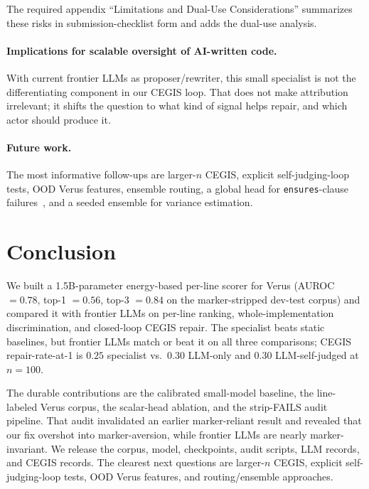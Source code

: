 \documentclass[10pt]{article}
\begin{document}
The required appendix ``Limitations and Dual-Use Considerations''
summarizes these risks in submission-checklist form and adds the
dual-use analysis.

\paragraph{Implications for scalable oversight of AI-written code.}
With current frontier LLMs as proposer/rewriter, this small specialist
is not the differentiating component in our CEGIS loop. That does not
make attribution irrelevant; it shifts the question to what kind of
signal helps repair, and which actor should produce it.

\paragraph{Future work.}
The most informative follow-ups are larger-$n$ CEGIS, explicit
self-judging-loop tests, OOD Verus features, ensemble routing, a global
head for \texttt{ensures}-clause failures~\cite{ilse2018attentionmil},
and a seeded ensemble for variance estimation.

\section{Conclusion}
\label{sec:conclusion}
We built a 1.5B-parameter energy-based per-line scorer for Verus
(AUROC $=0.78$, top-1 $=0.56$, top-3 $=0.84$ on the marker-stripped
dev-test corpus) and compared it with frontier LLMs on per-line
ranking, whole-implementation discrimination, and closed-loop CEGIS
repair. The specialist beats static baselines, but frontier LLMs match
or beat it on all three comparisons; CEGIS repair-rate-at-1 is
$0.25$ specialist vs.\ $0.30$ LLM-only and $0.30$ LLM-self-judged at
$n=100$.

The durable contributions are the calibrated small-model baseline, the
line-labeled Verus corpus, the scalar-head ablation, and the strip-FAILS
audit pipeline. That audit invalidated an earlier marker-reliant result
and revealed that our fix overshot into marker-aversion, while frontier
LLMs are nearly marker-invariant. We release the corpus, model,
checkpoints, audit scripts, LLM records, and CEGIS records. The clearest
next questions are larger-$n$ CEGIS, explicit self-judging-loop tests,
OOD Verus features, and routing/ensemble approaches.

\end{document}
